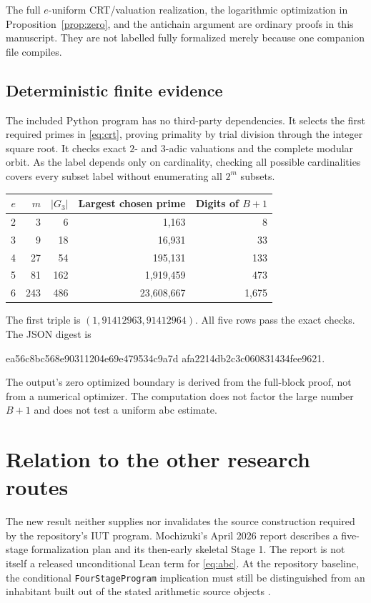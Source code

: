 \documentclass[11pt,a4paper]{article}
\theoremstyle{definition}
\theoremstyle{remark}
\begin{document}
The full $e$-uniform CRT/valuation realization, the logarithmic optimization
in Proposition~\ref{prop:zero}, and the antichain argument are ordinary
proofs in this manuscript. They are not labelled fully formalized merely
because one companion file compiles.

\subsection{Deterministic finite evidence}
The included Python program has no third-party dependencies. It selects the
first required primes in \eqref{eq:crt}, proving primality by trial division
through the integer square root. It checks exact $2$- and $3$-adic
valuations and the complete modular orbit. As the label depends only on
cardinality, checking all possible cardinalities covers every subset label
without enumerating all $2^m$ subsets.

\begin{center}
\begin{tabular}{rrrrr}
\toprule
$e$ & $m$ & $|G_3|$ & Largest chosen prime & Digits of $B+1$\\
\midrule
2 & 3 & 6 & 1,163 & 8\\
3 & 9 & 18 & 16,931 & 33\\
4 & 27 & 54 & 195,131 & 133\\
5 & 81 & 162 & 1,919,459 & 473\\
6 & 243 & 486 & 23,608,667 & 1,675\\
\bottomrule
\end{tabular}
\end{center}
The first triple is $(1,91412963,91412964)$. All five rows pass the exact
checks. The JSON digest is
\begin{center}\small\ttfamily
 ea56c8bc568e90311204e69e479534c9a7d\allowbreak
 afa2214db2c3c060831434fee9621.
\end{center}
The output's zero optimized boundary is derived from the full-block proof,
not from a numerical optimizer. The computation does not factor the large
number $B+1$ and does not test a uniform abc estimate.

\section{Relation to the other research routes}
The new result neither supplies nor invalidates the source construction
required by the repository's IUT program. Mochizuki's April 2026 report
\cite{iut} describes a five-stage formalization plan and its then-early
skeletal Stage 1. The report is not itself a released unconditional Lean
term for \eqref{eq:abc}. At the repository baseline, the conditional
\texttt{FourStageProgram} implication must still be distinguished from an
inhabitant built out of the stated arithmetic source objects \cite{repo}.
\end{document}
